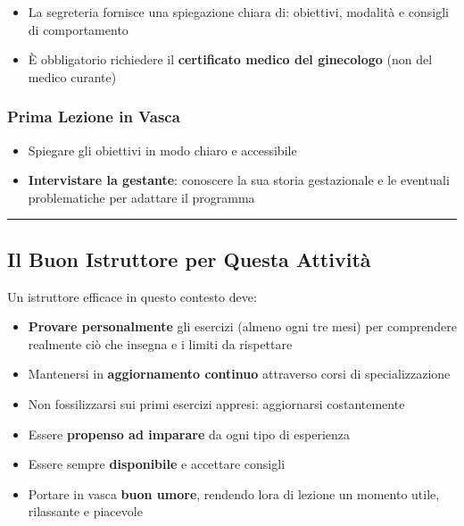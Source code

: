 \documentclass[a4paper,11pt]{article}
\providecommand{\tightlist}{%
  \setlength{\itemsep}{0pt}\setlength{\parskip}{0pt}}
\begin{document}
\begin{itemize}
      \tightlist
      \item
            La segreteria fornisce una spiegazione chiara di: obiettivi, modalità
            e consigli di comportamento
      \item
            È obbligatorio richiedere il \textbf{certificato medico del
                  ginecologo} (non del medico curante)
\end{itemize}

\subsubsection{Prima Lezione in Vasca}\label{prima-lezione-in-vasca}

\begin{itemize}
      \tightlist
      \item
            Spiegare gli obiettivi in modo chiaro e accessibile
      \item
            \textbf{Intervistare la gestante}: conoscere la sua storia
            gestazionale e le eventuali problematiche per adattare il programma
\end{itemize}

\begin{center}\rule{0.5\linewidth}{0.5pt}\end{center}

\subsection{Il Buon Istruttore per Questa
      Attività}\label{il-buon-istruttore-per-questa-attivituxe0}

Un istruttore efficace in questo contesto deve:

\begin{itemize}
      \tightlist
      \item
            \textbf{Provare personalmente} gli esercizi (almeno ogni tre mesi) per
            comprendere realmente ciò che insegna e i limiti da rispettare
      \item
            Mantenersi in \textbf{aggiornamento continuo} attraverso corsi di
            specializzazione
      \item
            Non fossilizzarsi sui primi esercizi appresi: aggiornarsi
            costantemente
      \item
            Essere \textbf{propenso ad imparare} da ogni tipo di esperienza
      \item
            Essere sempre \textbf{disponibile} e accettare consigli
      \item
            Portare in vasca \textbf{buon umore}, rendendo l\textquotesingle ora
            di lezione un momento utile, rilassante e piacevole
\end{itemize}
\end{document}
